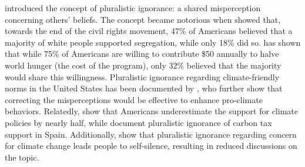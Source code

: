 \citet{allport_social_1924} introduced the concept of pluralistic ignorance: a shared misperception concerning others' beliefs. The concept became notorious when \citet{ogorman_pluralistic_1975} showed that, towards the end of the civil rights movement, 47\% of Americans believed that a majority of white people supported segregation, while only 18\% did so. %
\citet{pipa_americans_2001} has shown that while 75\% of Americans are willing to contribute \$50 annually to halve world hunger (the cost of the program), only 32\% believed that the majority would share this willingness. 
Pluralistic ignorance regarding climate-friendly norms in the United States has been documented by \citet{andre_misperceived_2022}, who further show that correcting the misperceptions would be effective to enhance pro-climate behaviors. Relatedly, \citet{sparkman_americans_2022} show that Americans underestimate the support for climate policies by nearly half, while \citet{drews_biased_2022} document pluralistic ignorance of carbon tax support in Spain. 
Additionally, \citet{geiger_climate_2016} show that pluralistic ignorance regarding concern for climate change leads people to self-silence, resulting in reduced discussions on the topic.

